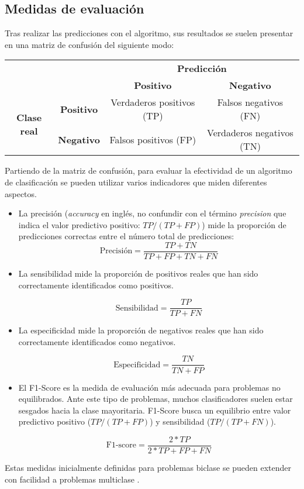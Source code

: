 \subsection{Medidas de evaluación}

Tras realizar las predicciones con el algoritmo, sus resultados se suelen presentar en una matriz de confusión del siguiente modo:

\begin{table}[H]
	\centering	
	\begin{tabular}{cc|c|c|}
		\cline{3-4}
		&                   & \multicolumn{2}{c|}{\textbf{Predicción}}              \\ \cline{3-4} 
		&                   & \textbf{Positivo}         & \textbf{Negativo}         \\ \hline
		\multicolumn{1}{|c|}{\multirow{2}{*}{\textbf{Clase real}}} & \textbf{Positivo} & Verdaderos positivos (TP) & Falsos negativos (FN)     \\ \cline{2-4} 
		\multicolumn{1}{|c|}{}                                     & \textbf{Negativo} & Falsos positivos (FP)     & Verdaderos negativos (TN) \\ \hline
	\end{tabular}
\end{table}

Partiendo de la matriz de confusión, para evaluar la efectividad de un algoritmo de clasificación se pueden utilizar varios indicadores que miden diferentes aspectos. 

\begin{itemize}
	\item La precisión (\textit{accuracy} en inglés, no confundir con el término \textit{precision} que indica el valor predictivo positivo: $TP / (TP + FP)$) mide la proporción de predicciones correctas entre el número total de predicciones:
	$$\text{Precisión} = \dfrac{TP + TN}{TP + FP + TN + FN}$$ 
	
	
	\item La sensibilidad mide la proporción de positivos reales que han sido correctamente identificados como positivos.
	
		$$\text{Sensibilidad} = \dfrac{TP}{TP + FN}$$ 
		
	\item La especificidad mide la proporción de negativos reales que han sido correctamente identificados como negativos.
	
			$$\text{Especificidad} = \dfrac{TN}{TN + FP}$$ 
			
	\item El F1-Score es la medida de evaluación más adecuada para problemas no equilibrados. Ante este tipo de problemas, muchos clasificadores suelen estar sesgados hacia la clase mayoritaria. F1-Score busca un equilibrio entre valor predictivo positivo ($TP/(TP + FP)$) y sensibilidad ($TP/(TP + FN)$).
	
				$$\text{F1-score} = \dfrac{2 * TP}{2 * TP + FP + FN}$$
\end{itemize}

Estas medidas inicialmente definidas para problemas biclase se pueden extender con facilidad a problemas multiclase \cite{Tharwat2018}.